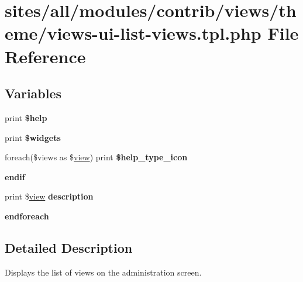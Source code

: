 \hypertarget{views-ui-list-views_8tpl_8php}{
\section{sites/all/modules/contrib/views/theme/views-ui-list-views.tpl.php File Reference}
\label{views-ui-list-views_8tpl_8php}
}
\subsection*{Variables}
\begin{CompactItemize}
\item 
\hypertarget{views-ui-list-views_8tpl_8php_ba6844125e75e2a6f95f76b8e833b8d3}{
print \textbf{\$help}}
\label{views-ui-list-views_8tpl_8php_ba6844125e75e2a6f95f76b8e833b8d3}

\item 
\hypertarget{views-ui-list-views_8tpl_8php_0945b44703edd16e92e706b37f8940a1}{
print \textbf{\$widgets}}
\label{views-ui-list-views_8tpl_8php_0945b44703edd16e92e706b37f8940a1}

\item 
\hypertarget{views-ui-list-views_8tpl_8php_963579502923607e0e4946401512d97f}{
foreach(\$views as \$\hyperlink{classview}{view}) print \textbf{\$help\_\-type\_\-icon}}
\label{views-ui-list-views_8tpl_8php_963579502923607e0e4946401512d97f}

\item 
\hypertarget{views-ui-list-views_8tpl_8php_cbf17b8d0af803f98d2d9f7422b0f84c}{
\textbf{endif}}
\label{views-ui-list-views_8tpl_8php_cbf17b8d0af803f98d2d9f7422b0f84c}

\item 
\hypertarget{views-ui-list-views_8tpl_8php_6216afa7b69405dc1f96c805f568469a}{
print \$\hyperlink{classview}{view} \textbf{description}}
\label{views-ui-list-views_8tpl_8php_6216afa7b69405dc1f96c805f568469a}

\item 
\hypertarget{views-ui-list-views_8tpl_8php_672d9707ef91db026c210f98cc601123}{
\textbf{endforeach}}
\label{views-ui-list-views_8tpl_8php_672d9707ef91db026c210f98cc601123}

\end{CompactItemize}


\subsection{Detailed Description}
Displays the list of views on the administration screen. 